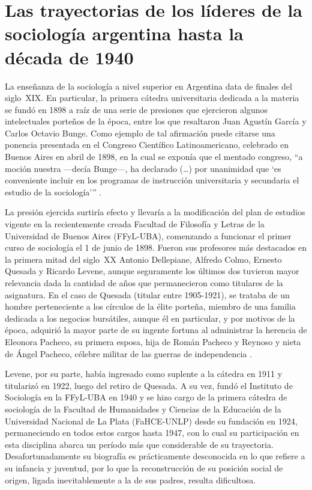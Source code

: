 \section{Las trayectorias de los líderes de la sociología argentina hasta la década de 1940}

La enseñanza de la sociología a nivel superior en Argentina data de finales del siglo~XIX. En particular, la primera cátedra universitaria dedicada a la materia se fundó en 1898 a raíz de una serie de presiones que ejercieron algunos intelectuales porteños de la época, entre los que resaltaron Juan Agustín García y Carlos Octavio Bunge. Como ejemplo de tal afirmación puede citarse una ponencia presentada en el Congreso Científico Latinoamericano, celebrado en Buenos Aires en abril de 1898, en la cual se exponía que el mentado congreso, \enquote{a moción nuestra ---decía Bunge---, ha declarado (\dots) por unanimidad que \enquote{es conveniente incluir en los programas de instrucción universitaria y secundaria el estudio de la sociología}} \parencite[80]{1445-BUNGE1898}.

La presión ejercida surtiría efecto y llevaría a la modificación del plan de estudios vigente en la recientemente creada Facultad de Filosofía y Letras de la Universidad de Buenos Aires (FFyL-UBA), comenzando a funcionar el primer curso de sociología el 1 de junio de 1898. Fueron sus profesores más destacados en la primera mitad del siglo~XX Antonio Dellepiane, Alfredo Colmo, Ernesto Quesada y Ricardo Levene, aunque seguramente los últimos dos tuvieron mayor relevancia dada la cantidad de años que permanecieron como titulares de la asignatura. En el caso de Quesada (titular entre 1905-1921), se trataba de un hombre perteneciente a los círculos de la élite porteña, miembro de una familia dedicada a los negocios bursátiles, aunque él en particular, y por motivos de la época, adquirió la mayor parte de su ingente fortuna al administrar la herencia de Eleonora Pacheco, su primera esposa, hija de Román Pacheco y Reynoso y nieta de Ángel Pacheco, célebre militar de las guerras de independencia \parencite{1535-BUCHBINDER2012}.

Levene, por su parte, había ingresado como suplente a la cátedra en 1911 y titularizó en 1922, luego del retiro de Quesada. A su vez, fundó el Instituto de Sociología en la FFyL-UBA en 1940 y se hizo cargo de la primera cátedra de sociología de la Facultad de Humanidades y Ciencias de la Educación de la Universidad Nacional de La Plata (FaHCE-UNLP) desde su fundación en 1924, permaneciendo en todos estos cargos hasta 1947, con lo cual su participación en esta disciplina abarca un período más que considerable de su trayectoria. Desafortunadamente su biografía es prácticamente desconocida en lo que refiere a su infancia y juventud, por lo que la reconstrucción de su posición social de origen, ligada inevitablemente a la de sus padres, resulta dificultosa.

